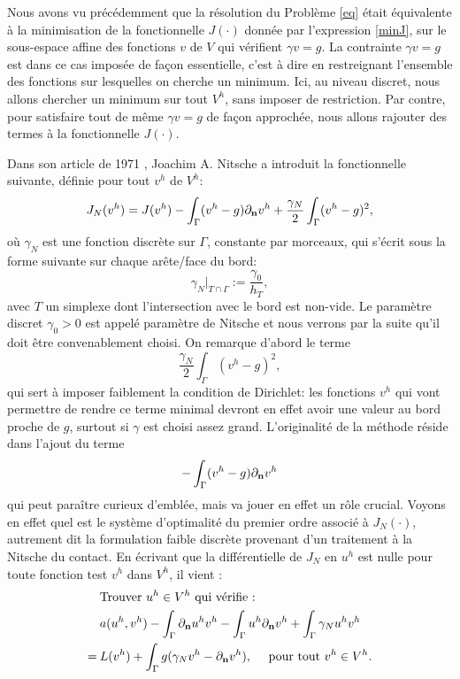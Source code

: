 \documentclass[11pt]{book}
\def\n{{\bf n}}
\newcommand{\dnu}{\partial_{\n} u}
\newcommand{\dnv}{\partial_{\n} v}
\begin{document}
Nous avons vu précédemment que la résolution du Problème \eqref{eq} était équivalente à la minimisation de la fonctionnelle $J(\cdot)$ donnée par l'expression \eqref{minJ}, sur le sous-espace affine des fonctions $v$ de $V$ qui vérifient $\gamma v = g$. La contrainte $\gamma v = g$ est dans ce cas imposée de façon essentielle, 
c'est à dire en restreignant l'ensemble des fonctions sur lesquelles on cherche un minimum. Ici, au niveau discret, nous allons chercher un minimum sur tout $V^h$, sans imposer de restriction. Par contre, pour satisfaire tout de même $\gamma v = g$ de façon approchée, nous allons rajouter des termes à la fonctionnelle $J(\cdot)$.

Dans son article de 1971 \cite{nitsche-71}, Joachim A. Nitsche a introduit la fonctionnelle suivante, définie pour tout $v^h$ de $V^h$:
\[
J_N ( v^h ) = J ( v^h ) 
-  \int_\Gamma ( v^h  - g ) \dnv^h
+ \frac{\gamma_N}{2} \int_\Gamma (v^h-g)^2, 
\]
où $\gamma_N$ est une fonction discrète sur $\Gamma$, constante par morceaux, qui s'écrit sous la forme suivante sur chaque arête/face du bord:
\[
\gamma_N |_{T\cap\Gamma} := \frac{\gamma_0}{h_T},
\]
avec $T$ un simplexe dont l'intersection avec le bord est non-vide.
Le paramètre discret $\gamma_0 > 0$ est appelé paramètre de Nitsche et nous verrons par la suite qu'il doit être convenablement choisi.
On remarque d'abord le terme 
\[
\frac{\gamma_N}{2} \int_\Gamma (v^h-g)^2, 
\]
qui sert à imposer faiblement la condition de Dirichlet: les fonctions $v^h$ qui vont permettre de rendre ce terme minimal devront en effet avoir une valeur au bord proche de $g$, surtout si $\gamma$ est choisi assez grand.
L'originalité de la méthode réside dans l'ajout du terme
\[
-  \int_\Gamma ( v^h  - g ) \dnv^h
\]
qui peut paraître curieux d'emblée, mais va jouer en effet un rôle crucial. Voyons en effet quel est le système d'optimalité du premier ordre associé à $J_N(\cdot)$, autrement dit la formulation faible discrète provenant d'un traitement à la Nitsche du contact. En écrivant que la différentielle de $J_N$ en $u^h$ est nulle pour toute fonction test $v^h$ dans $V^h$, il vient :
\begin{align} 
\label{nitsche}
&\textrm{Trouver } u^h \in V^h \textrm{ qui vérifie :}\nonumber\\
&%
a(u^h,v^h) 
- \int_\Gamma \dnu^h v^h
- \int_\Gamma u^h \dnv^h
+ \int_\Gamma \gamma_N u^h v^h \nonumber \\= \:&L(v^h) 
+ \int_\Gamma  g ( \gamma_N v^h - \dnv^h ), 
\quad \textrm{ pour tout } v^h \in V^h.
\end{align}
\end{document}
